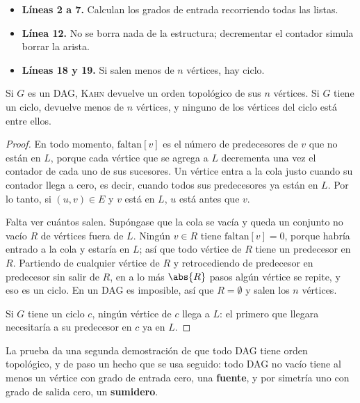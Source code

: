 \documentclass[11pt,letterpaper]{article}
\begin{document}
\begin{itemize}[itemsep=0.1em]
  \item \textbf{Líneas 2 a 7.} Calculan los grados de entrada
        recorriendo todas las listas.
  \item \textbf{Línea 12.} No se borra nada de la estructura;
        decrementar el contador simula borrar la arista.
  \item \textbf{Líneas 18 y 19.} Si salen menos de $n$ vértices, hay
        ciclo.
\end{itemize}

\begin{proposicion}
  \label{prop:kahn-correcto}
  Si $G$ es un DAG, {\upshape\textsc{Kahn}} devuelve un orden
  topológico de sus $n$ vértices. Si $G$ tiene un ciclo, devuelve
  menos de $n$ vértices, y ninguno de los vértices del ciclo está entre
  ellos.
\end{proposicion}

\begin{proof}
  En todo momento, $\text{faltan}[v]$ es el número de predecesores de
  $v$ que no están en $L$, porque cada vértice que se agrega a $L$
  decrementa una vez el contador de cada uno de sus sucesores. Un
  vértice entra a la cola justo cuando su contador llega a cero, es
  decir, cuando todos sus predecesores ya están en $L$. Por lo tanto,
  si $(u, v) \in E$ y $v$ está en $L$, $u$ está antes que $v$.

  Falta ver cuántos salen. Supóngase que la cola se vacía y queda un
  conjunto no vacío $R$ de vértices fuera de $L$. Ningún $v \in R$
  tiene $\text{faltan}[v] = 0$, porque habría entrado a la cola y
  estaría en $L$; así que todo vértice de $R$ tiene un predecesor en
  $R$. Partiendo de cualquier vértice de $R$ y retrocediendo de
  predecesor en predecesor sin salir de $R$, en a lo más $\abs{R}$
  pasos algún vértice se repite, y eso es un ciclo. En un DAG es
  imposible, así que $R = \emptyset$ y salen los $n$ vértices.

  Si $G$ tiene un ciclo $c$, ningún vértice de $c$ llega a $L$: el
  primero que llegara necesitaría a su predecesor en $c$ ya en $L$.
\end{proof}

La prueba da una segunda demostración de que todo DAG tiene orden
topológico, y de paso un hecho que se usa seguido: todo DAG no vacío
tiene al menos un vértice con grado de entrada cero, una
\textbf{fuente}, y por simetría uno con grado de salida cero, un
\textbf{sumidero}.
\end{document}
